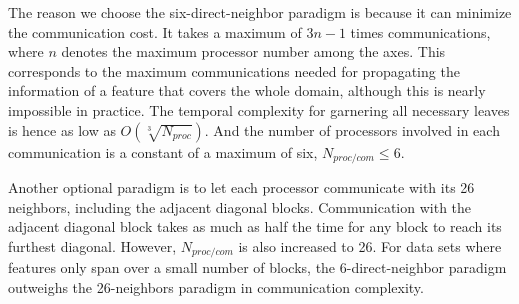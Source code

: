 The reason we choose the six-direct-neighbor paradigm is because it can minimize the communication cost. It takes a maximum of ${3n-1}$ times communications, where $n$ denotes the maximum processor number among the axes. This corresponds to the maximum communications needed for propagating the information of a feature that covers the whole domain, although this is nearly impossible in practice. The temporal complexity for garnering all necessary leaves is hence as low as ${O(\sqrt[3]{N_{proc}})}$. And the number of processors involved in each communication is a constant of a maximum of six, $N_{proc/com} \leq 6$.

Another optional paradigm is to let each processor communicate with its 26 neighbors, including the adjacent diagonal blocks. Communication with the adjacent diagonal block takes as much as half the time for any block to reach its furthest diagonal. However, $N_{proc/com}$  is also increased to 26. For data sets where features only span over a small number of blocks, the 6-direct-neighbor paradigm outweighs the 26-neighbors paradigm in communication complexity.

% 
% 		
% 		

